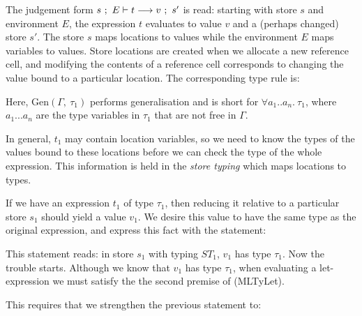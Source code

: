 
\medskip
The judgement form $s \ ; \  E \vdash t \longrightarrow v \ ; \  s'$ is read: starting with store $s$ and environment $E$, the expression $t$ evaluates to value $v$ and a (perhaps changed) store $s'$. The store $s$ maps locations to values while the environment $E$ maps variables to values. Store locations are created when we allocate a new reference cell, and modifying the contents of a reference cell corresponds to changing the value bound to a particular location. The corresponding type rule is:


\medskip
Here, $\textrm{Gen}(\Gamma, \ \tau_1)$ performs generalisation and is short for $\forall a_1 .. a_n. \ \tau_1$, where $a_1 ...  a_n$ are the type variables in $\tau_1$ that are not free in $\Gamma$. 

In general, $t_1$ may contain location variables, so we need to know the types of the values bound to these locations before we can check the type of the whole expression. This information is held in the \emph{store typing} which maps locations to types. 

If we have an expression $t_1$ of type $\tau_1$, then reducing it relative to a particular store $s_1$ should yield a value $v_1$. We desire this value to have the same type as the original expression, and express this fact with the statement:


This statement reads: in store $s_1$ with typing $ST_1$, $v_1$ has type $\tau_1$. Now the trouble starts. Although we know that $v_1$ has type $\tau_1$, when evaluating a let-expression we must satisfy the the second premise of (MLTyLet). 

\clearpage{}
This requires that we strengthen the previous statement to:

